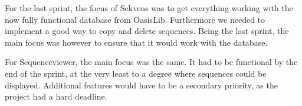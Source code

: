 For the last sprint, the focus of Sekvens was to get everything working with the now fully functional database from OasisLib. Furthermore we needed to implement a good way to copy and delete sequences. Being the last sprint, the main focus was however to ensure that it would work with the database.

For Sequenceviewer, the main focus was the same. It had to be functional by the end of the sprint, at the very least to a degree where sequences could be displayed. Additional features would have to be a secondary priority, as the project had a hard deadline.